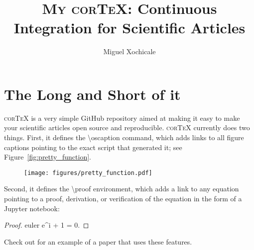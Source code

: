 \documentclass[modern]{aastex62}
\begin{document}
\title{\textsc{My corTeX}: Continuous Integration for Scientific Articles}

\author[0000-0002-8225-7517]{Miguel Xochicale}


\section{The Long and Short of it}
\label{sec:intro}
%
\textsc{corTeX} is a very simple \textsf{GitHub} repository aimed at making
it easy to make your scientific articles open source and reproducible.
\textsc{corTeX} currently does two things. First, it defines the
\textsf{\textbackslash oscaption} command, which adds
links to all figure captions pointing to the exact script that generated it;
see Figure~\ref{fig:pretty_function}.
%
\begin{figure}[h!]
    \begin{centering}
    \texttt{[image: figures/pretty\_function.pdf]}
    \end{centering}
\end{figure}
%

Second, it defines the \textsf{\textbackslash proof} environment, which
adds a link to any equation pointing to a proof, derivation, or
verification of the equation in the form of a \textsf{Jupyter} notebook:
%
\begin{proof}{euler}
    \label{eq:euler}
    e^{i\pi} + 1 = 0.
\end{proof}
%
Check out \citet{Luger2018} for an example of a paper that uses these
features.

\pagebreak

\end{document}

